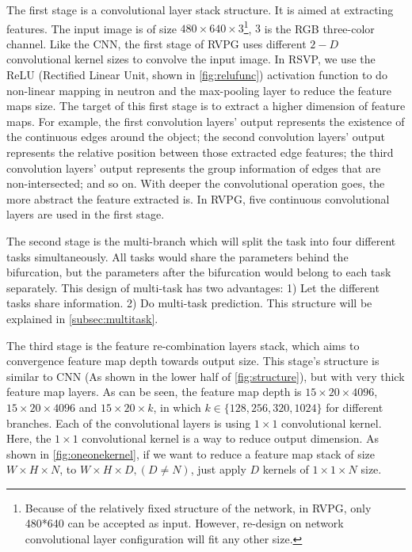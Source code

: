 \begin{spacing}{1.5}
The first stage is a convolutional layer stack structure. It is aimed at extracting features. The input image is of size $480 \times 640 \times 3$\footnote{Because of the relatively fixed structure of the network, in RVPG, only 480*640 can be accepted as input. However, re-design on network convolutional layer configuration will fit any other size.}, $3$ is the RGB three-color channel. Like the CNN, the first stage of RVPG uses different $2-D$ convolutional kernel sizes to convolve the input image. In RSVP, we use the ReLU (Rectified Linear Unit, shown in \autoref{fig:relufunc}) activation function to do non-linear mapping in neutron and the max-pooling layer to reduce the feature maps size. The target of this first stage is to extract a higher dimension of feature maps. For example, the first convolution layers' output represents the existence of the continuous edges around the object; the second convolution layers' output represents the relative position between those extracted edge features; the third convolution layers' output represents the group information of edges that are non-intersected; and so on. With deeper the convolutional operation goes, the more abstract the feature extracted is. In RVPG, five continuous convolutional layers are used in the first stage.

The second stage is the multi-branch which will split the task into four different tasks simultaneously. All tasks would share the parameters behind the bifurcation, but the parameters after the bifurcation would belong to each task separately. This design of multi-task has two advantages: 1) Let the different tasks share information. 2) Do multi-task prediction. This structure will be explained in \autoref{subsec:multitask}.

The third stage is the feature re-combination layers stack, which aims to convergence feature map depth towards output size. This stage's structure is similar to CNN (As shown in the lower half of \autoref{fig:structure}), but with very thick feature map layers. As can be seen, the feature map depth is $15 \times 20 \times 4096$, $15 \times 20 \times 4096$ and $15 \times 20 \times k$, in which $k \in \{128, 256, 320, 1024\}$ for different branches. Each of the convolutional layers is using $1 \times 1$ convolutional kernel. Here, the $1 \times 1$ convolutional kernel is a way to reduce output dimension. As shown in \autoref{fig:oneonekernel}, if we want to reduce a feature map stack of size $W \times H \times N$, to $W \times H \times D, (D \neq N)$, just apply $D$ kernels of $1 \times 1 \times N$ size.


\end{spacing}
